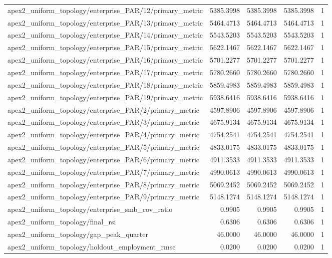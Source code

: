 \begin{table}[h]
\begin{tabular}{lrrrr}
apex2_uniform_topology/enterprise_PAR/12/primary_metric & 5385.3998 & 5385.3998 & 5385.3998 & 1 \\
apex2_uniform_topology/enterprise_PAR/13/primary_metric & 5464.4713 & 5464.4713 & 5464.4713 & 1 \\
apex2_uniform_topology/enterprise_PAR/14/primary_metric & 5543.5203 & 5543.5203 & 5543.5203 & 1 \\
apex2_uniform_topology/enterprise_PAR/15/primary_metric & 5622.1467 & 5622.1467 & 5622.1467 & 1 \\
apex2_uniform_topology/enterprise_PAR/16/primary_metric & 5701.2277 & 5701.2277 & 5701.2277 & 1 \\
apex2_uniform_topology/enterprise_PAR/17/primary_metric & 5780.2660 & 5780.2660 & 5780.2660 & 1 \\
apex2_uniform_topology/enterprise_PAR/18/primary_metric & 5859.4983 & 5859.4983 & 5859.4983 & 1 \\
apex2_uniform_topology/enterprise_PAR/19/primary_metric & 5938.6416 & 5938.6416 & 5938.6416 & 1 \\
apex2_uniform_topology/enterprise_PAR/2/primary_metric & 4597.8906 & 4597.8906 & 4597.8906 & 1 \\
apex2_uniform_topology/enterprise_PAR/3/primary_metric & 4675.9134 & 4675.9134 & 4675.9134 & 1 \\
apex2_uniform_topology/enterprise_PAR/4/primary_metric & 4754.2541 & 4754.2541 & 4754.2541 & 1 \\
apex2_uniform_topology/enterprise_PAR/5/primary_metric & 4833.0175 & 4833.0175 & 4833.0175 & 1 \\
apex2_uniform_topology/enterprise_PAR/6/primary_metric & 4911.3533 & 4911.3533 & 4911.3533 & 1 \\
apex2_uniform_topology/enterprise_PAR/7/primary_metric & 4990.0613 & 4990.0613 & 4990.0613 & 1 \\
apex2_uniform_topology/enterprise_PAR/8/primary_metric & 5069.2452 & 5069.2452 & 5069.2452 & 1 \\
apex2_uniform_topology/enterprise_PAR/9/primary_metric & 5148.1274 & 5148.1274 & 5148.1274 & 1 \\
apex2_uniform_topology/enterprise_smb_cov_ratio & 0.9905 & 0.9905 & 0.9905 & 1 \\
apex2_uniform_topology/final_rsi & 0.6306 & 0.6306 & 0.6306 & 1 \\
apex2_uniform_topology/gap_peak_quarter & 46.0000 & 46.0000 & 46.0000 & 1 \\
apex2_uniform_topology/holdout_employment_rmse & 0.0200 & 0.0200 & 0.0200 & 1 \\

\end{tabular}
\end{table}
